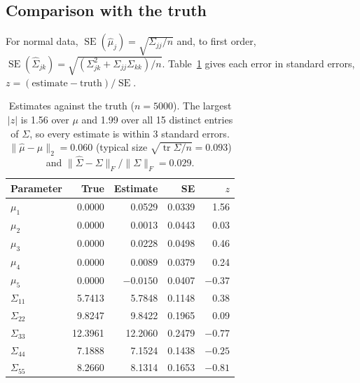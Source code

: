 \documentclass[11pt]{article}
\theoremstyle{definition}
\newcommand{\tr}{\operatorname{tr}}
\begin{document}
\subsection{Comparison with the truth}
For normal data, $\operatorname{SE}(\hat\mu_j)=\sqrt{\Sigma_{jj}/n}$ and, to first order, $\operatorname{SE}(\hat\Sigma_{jk})=\sqrt{(\Sigma_{jk}^2+\Sigma_{jj}\Sigma_{kk})/n}$. Table~\ref{tab:simtruth} gives each error in standard errors, $z=(\text{estimate}-\text{truth})/\operatorname{SE}$.
\begin{table}[H]
\centering
\small
\begin{tabular}{@{}lrrrr@{}}
\toprule
Parameter & True & Estimate & SE & $z$ \\
\midrule
$\mu_1$ & 0.0000 & 0.0529 & 0.0339 & 1.56 \\
$\mu_2$ & 0.0000 & 0.0013 & 0.0443 & 0.03 \\
$\mu_3$ & 0.0000 & 0.0228 & 0.0498 & 0.46 \\
$\mu_4$ & 0.0000 & 0.0089 & 0.0379 & 0.24 \\
$\mu_5$ & 0.0000 & $-0.0150$ & 0.0407 & $-0.37$ \\
$\Sigma_{11}$ & 5.7413 & 5.7848 & 0.1148 & 0.38 \\
$\Sigma_{22}$ & 9.8247 & 9.8422 & 0.1965 & 0.09 \\
$\Sigma_{33}$ & 12.3961 & 12.2060 & 0.2479 & $-0.77$ \\
$\Sigma_{44}$ & 7.1888 & 7.1524 & 0.1438 & $-0.25$ \\
$\Sigma_{55}$ & 8.2660 & 8.1314 & 0.1653 & $-0.81$ \\
\bottomrule
\end{tabular}
\caption{Estimates against the truth ($n=5000$). The largest $|z|$ is 1.56 over $\mu$ and 1.99 over all 15 distinct entries of $\Sigma$, so every estimate is within 3 standard errors. $\|\hat\mu-\mu\|_2=0.060$ (typical size $\sqrt{\tr\Sigma/n}=0.093$) and $\|\hat\Sigma-\Sigma\|_F/\|\Sigma\|_F=0.029$.}
\label{tab:simtruth}
\end{table}
\end{document}
